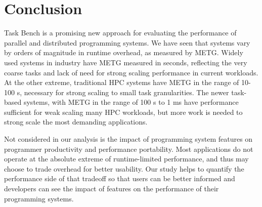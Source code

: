 \section{Conclusion}
\label{sec:conclusion}

Task Bench is a promising new approach for evaluating the performance
of parallel and distributed programming systems. We have seen that
systems vary by orders of magnitude in runtime overhead, as measured
by METG. Widely used systems in industry have METG measured in
seconds, reflecting the very coarse tasks and lack of need for strong
scaling performance in current workloads. At the other extreme,
traditional HPC systems have METG in the range of 10-100 \textmu{}s,
necessary for strong scaling to small task granularities. The newer
task-based systems, with METG in the range of 100 \textmu{}s to 1 ms
have performance sufficient for weak scaling many HPC workloads, but
more work is needed to strong scale the most demanding applications.

Not considered in our analysis is the impact of programming system
features on programmer productivity and performance portability. Most
applications do not operate at the absolute extreme of runtime-limited
performance, and thus may choose to trade overhead for better
usability. Our study helps to quantify the performance side of that
tradeoff so that users can be better informed and developers can see
the impact of features on the performance of their programming
systems.
